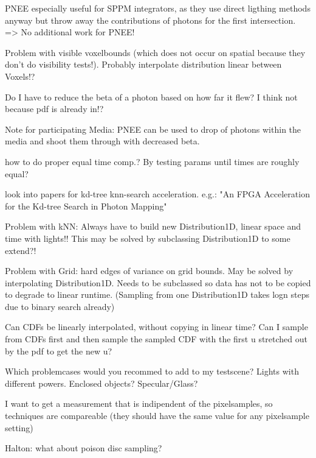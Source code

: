 PNEE especially useful for SPPM integrators, as they use direct ligthing methods anyway but throw away the contributions of photons for the first intersection. => No additional work for PNEE!

Problem with visible voxelbounds (which does not occur on spatial because they don't do visibility tests!). Probably interpolate distribution linear between Voxels!?

Do I have to reduce the beta of a photon based on how far it flew? I think not because pdf is already in!?

Note for participating Media: PNEE can be used to drop of photons within the media and shoot them through with decreased beta.

how to do proper equal time comp.? By testing params until times are roughly equal?

look into papers for kd-tree knn-search acceleration. e.g.: "An FPGA Acceleration for the Kd-tree Search in Photon Mapping"

Problem with kNN: Always have to build new Distribution1D, linear space and time with lights!! This may be solved by subclassing Distribution1D to some extend?!

Problem with Grid: hard edges of variance on grid bounds. May be solved by interpolating Distribution1D. Needs to be subclassed so data has not to be copied to degrade to linear runtime. (Sampling from one Distribution1D takes logn steps due to binary search already)

Can CDFs be linearly interpolated, without copying in linear time? Can I sample from CDFs first and then sample the sampled CDF with the first u stretched out by the pdf to get the new u?

Which problemcases would you recommed to add to my testscene? Lights with different powers. Enclosed objects? Specular/Glass?

I want to get a measurement that is indipendent of the pixelsamples, so techniques are compareable (they should have the same value for any pixelsample setting)

Halton: what about poison disc sampling?